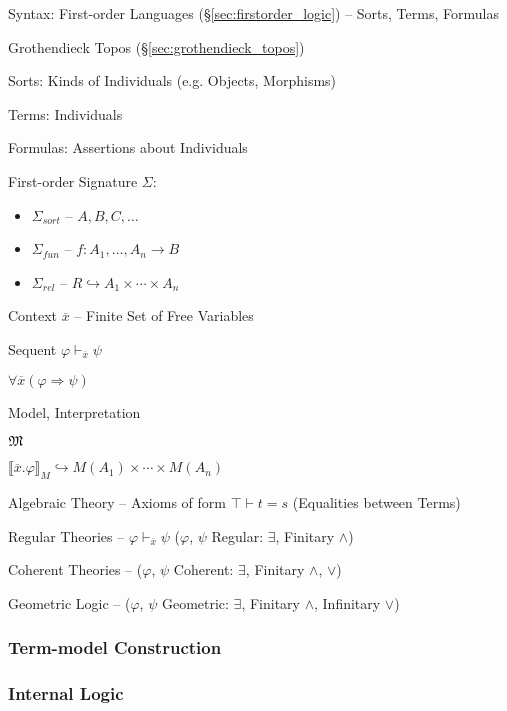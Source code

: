 Syntax: First-order Languages (\S\ref{sec:firstorder_logic}) --
Sorts, Terms, Formulas

Grothendieck Topos (\S\ref{sec:grothendieck_topos})

Sorts: Kinds of Individuals (e.g. Objects, Morphisms) %

Terms: Individuals

Formulas: Assertions about Individuals


First-order Signature $\Sigma$:
\begin{itemize}
  \item $\Sigma_{sort}$ -- $A,B,C,\ldots$
  \item $\Sigma_{fun}$ -- $f : A_1, \ldots, A_n \rightarrow B$
  \item $\Sigma_{rel}$ -- $R \hookrightarrow A_1 \times \cdots \times
    A_n$
\end{itemize}

Context $\overline{x}$ -- Finite Set of Free Variables

Sequent $\varphi \vdash_{\overline{x}} \psi$

$\forall \overline{x} (\varphi \Rightarrow \psi)$

Model, Interpretation

$\mathfrak{M}$

$\llbracket \overline{x}.\varphi \rrbracket_M \hookrightarrow M(A_1)
\times \cdots \times M(A_n)$


Algebraic Theory -- Axioms of form $\top \vdash t = s$ (Equalities
between Terms)

Regular Theories -- $\varphi \vdash_{\overline{x}} \psi$ ($\varphi$,
$\psi$ Regular: $\exists$, Finitary $\wedge$)

Coherent Theories -- ($\varphi$, $\psi$ Coherent: $\exists$, Finitary
$\wedge$, $\vee$)

Geometric Logic -- ($\varphi$, $\psi$ Geometric: $\exists$, Finitary
$\wedge$, Infinitary $\vee$)




\subsubsection{Term-model Construction}\label{sec:term_model}

\subsubsection{Internal Logic}\label{sec:internal_logic}

